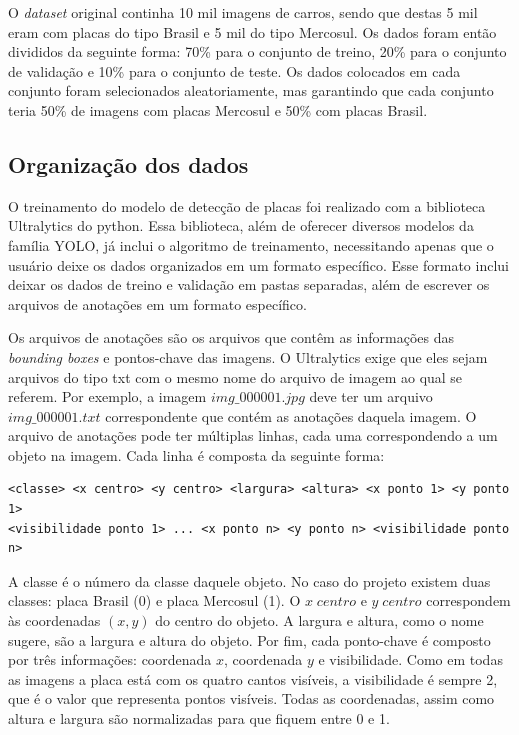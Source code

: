 O \textit{dataset} original continha 10 mil imagens de carros, sendo que destas 5 mil eram com placas do tipo Brasil e 5 mil do tipo Mercosul. Os dados foram então divididos da seguinte forma: 70\% para o conjunto de treino, 20\% para o conjunto de validação e 10\% para o conjunto de teste. Os dados colocados em cada conjunto foram selecionados aleatoriamente, mas garantindo que cada conjunto teria 50\% de imagens com placas Mercosul e 50\% com placas Brasil.

\subsection{Organização dos dados}
O treinamento do modelo de detecção de placas foi realizado com a biblioteca Ultralytics do python. Essa biblioteca, além de oferecer diversos modelos da família YOLO, já inclui o algoritmo de treinamento, necessitando apenas que o usuário deixe os dados organizados em um formato específico. Esse formato inclui deixar os dados de treino e validação em pastas separadas, além de escrever os arquivos de anotações em um formato específico.

Os arquivos de anotações são os arquivos que contêm as informações das \textit{bounding boxes} e pontos-chave das imagens. O Ultralytics exige que eles sejam arquivos do tipo txt com o mesmo nome do arquivo de imagem ao qual se referem. Por exemplo, a imagem $img\_000001.jpg$ deve ter um arquivo $img\_000001.txt$ correspondente que contém as anotações daquela imagem.
O arquivo de anotações pode ter múltiplas linhas, cada uma correspondendo a um objeto na imagem. Cada linha é composta da seguinte forma:

\begin{verbatim} 
<classe> <x centro> <y centro> <largura> <altura> <x ponto 1> <y ponto 1> 
<visibilidade ponto 1> ... <x ponto n> <y ponto n> <visibilidade ponto n> 
\end{verbatim}

A classe é o número da classe daquele objeto. No caso do projeto existem duas classes: placa Brasil (0) e placa Mercosul (1). O $x \; centro$ e $y \; centro$ correspondem às coordenadas $(x,y)$ do centro do objeto. A largura e altura, como o nome sugere, são a largura e altura do objeto. Por fim, cada ponto-chave é composto por três informações: coordenada $x$, coordenada $y$ e visibilidade. Como em todas as imagens a placa está com os quatro cantos visíveis, a visibilidade é sempre 2, que é o valor que representa pontos visíveis. Todas as coordenadas, assim como altura e largura são normalizadas para que fiquem entre 0 e 1.

